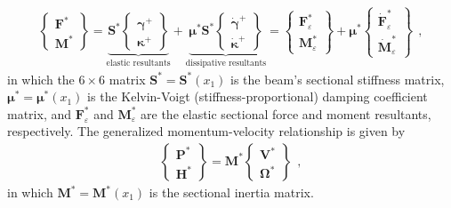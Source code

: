 \documentclass[journal]{new-aiaa}
\newcommand{\vect}[1]{\bm{#1}}
\def\tens#1{\bm{#1}}
\def\xo{x_1}
\def\gam{\vect{\gamma}}
\def\gamp{\gam^{+}}
\def\gampdot{\dot{\gam}^{+}}
\def\kap{\vect{\kappa}}
\def\kappdot{\dot{\kap}^{+}}
\def\kapp{\kap^{+}}
\def\V{\vect{V}}
\def\Vs{\V^{*}}
\def\Om{\vect{\Omega}}
\def\Oms{\Om^{*}}
\def\P{\vect{P}}
\def\Ps{\P^*}
\def\Hv{\vect{H}}
\def\Hvs{\Hv^*}
\def\F{\vect{F}}
\def\Fs{\F^*}
\def\M{\vect{M}}
\def\Ms{\M^*}
\def\Stiff{\mathcal{\tens{S}}^*}
\def\Mass{\mathcal{\tens{M}}^*}
\def\Damp{\mathcal{\tens{\mu}}^*}
\def\Fseps{\F^*_{\varepsilon}}
\def\Mseps{\M^*_{\varepsilon}}
\def\Fsepsdot{\dot{\F}^*_{\varepsilon}}
\def\Msepsdot{\dot{\M}^*_{\varepsilon}}
\begin{document}
\begin{align}
    \begin{Bmatrix}
    \Fs \\ \Ms
    \end{Bmatrix}
    = \underbrace{\Stiff
    \begin{Bmatrix}
    \gamp \\ \kapp
    \end{Bmatrix}}_{\text{elastic resultants}}
    + \underbrace{\Damp\Stiff
    \begin{Bmatrix}
    \gampdot \\ \kappdot
    \end{Bmatrix}}_{\text{dissipative resultants}}
    = 
	\begin{Bmatrix}
    \Fseps \\ \Mseps
    \end{Bmatrix}
    + \Damp
    \begin{Bmatrix}
    \Fsepsdot \\ \Msepsdot
    \end{Bmatrix} \ \ ,
    \label{eq:constitutive_stiffness}
\end{align}
in which the $6 \times 6$ matrix $\Stiff=\Stiff(\xo)$ is the beam's sectional stiffness matrix, $\Damp=\Damp(\xo)$ is the Kelvin-Voigt (stiffness-proportional) damping coefficient matrix, and $\Fseps$ and $\Mseps$ are the elastic sectional force and moment resultants, respectively.
The generalized momentum-velocity relationship is given by
\begin{align}
    \begin{Bmatrix}
        \Ps \\ \Hvs
    \end{Bmatrix}
    = \Mass
    \begin{Bmatrix}
        \Vs \\ \Oms
    \end{Bmatrix} \ \ ,
    \label{eq:constitutive_inertia}
\end{align}
in which $\Mass=\Mass(\xo)$ is the sectional inertia matrix.
\end{document}
